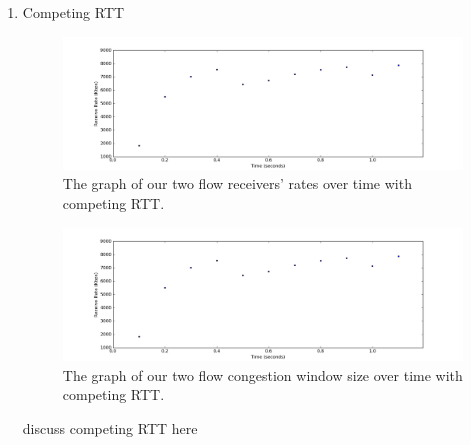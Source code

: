 \documentclass[11pt]{article}
\begin{document}
\begin{enumerate}
\bigskip
\item Competing RTT

\begin{figure}[H]
\caption{The graph of our two flow receivers' rates over time with competing RTT.}
  \label{figure17}
    \centering
    \includegraphics[width=\linewidth]{1f_rate.png}
\end{figure}

\begin{figure}[H]
\caption{The graph of our two flow congestion window size over time with competing RTT.}
  \label{figure18}
    \centering
    \includegraphics[width=\linewidth]{1f_rate.png}
\end{figure}

discuss competing RTT here

\end{enumerate}
\end{document}
